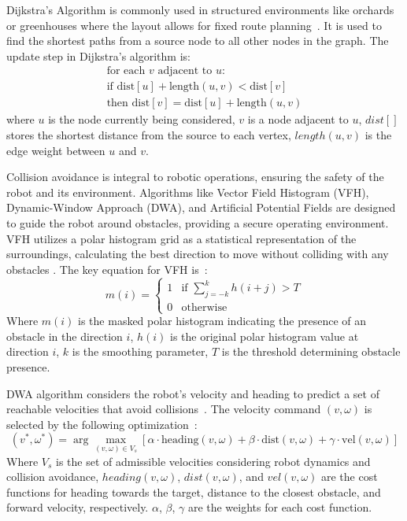 \documentclass[a4paper,fleqn]{cas-dc}
\begin{document}
Dijkstra’s Algorithm is commonly used in structured environments like orchards or greenhouses where the layout allows for fixed route planning~\cite{silwal2017design, dijkstra1959note}. It is used to find the shortest paths from a source node to all other nodes in the graph. The update step in Dijkstra's algorithm is:
\begin{equation}
\begin{aligned}
\text{for each } v \text{ adjacent to } u: \\
\text{if } \text{dist}[u] + \text{length}(u, v) < \text{dist}[v] \\
\text{then } \text{dist}[v] = \text{dist}[u] + \text{length}(u, v)
\end{aligned}
\label{eq:dijkstra}
\end{equation}
where $u$ is the node currently being considered, $v$ is a node adjacent to $u$, $dist[]$ stores the shortest distance from the source to each vertex, $length(u,v)$ is the edge weight between $u$ and $v$.

Collision avoidance is integral to robotic operations, ensuring the safety of the robot and its environment. Algorithms like Vector Field Histogram (VFH), Dynamic-Window Approach (DWA), and Artificial Potential Fields are designed to guide the robot around obstacles, providing a secure operating environment. 
VFH utilizes a polar histogram grid as a statistical representation of the surroundings, calculating the best direction to move without colliding with any obstacles \cite{silwal2017design}. The key equation for VFH is~\cite{borenstein1991vfh}:
\begin{equation}
m(i) = \begin{cases} 
1 & \text{if } \sum_{j=-k}^k h(i+j) > T \\
0 & \text{otherwise} 
\end{cases}
\label{eq:vfh}
\end{equation}
Where $m(i)$ is the masked polar histogram indicating the presence of an obstacle in the direction $i$,
$h(i)$ is the original polar histogram value at direction $i$, $k$ is the smoothing parameter, $T$ is the threshold determining obstacle presence.

DWA algorithm considers the robot's velocity and heading to predict a set of reachable velocities that avoid collisions~\cite{sepulveda2020robotic}.   The velocity command $(v,\omega)$ is selected by the following optimization~\cite{fox1997dynamic}:
\begin{equation}
(v^*, \omega^*) = \arg \max_{(v, \omega) \in V_s} [ \alpha \cdot \text{heading}(v, \omega) + \beta \cdot \text{dist}(v, \omega) + \gamma \cdot \text{vel}(v, \omega) ]
\label{eq:dwa}
\end{equation}
Where $V_s$ is the set of admissible velocities considering robot dynamics and collision avoidance, $heading(v, \omega)$, $dist(v, \omega)$, and $vel(v, \omega)$ are the cost functions for heading towards the target, distance to the closest obstacle, and forward velocity, respectively. $\alpha$, $\beta$, $\gamma$ are the weights for each cost function.
\end{document}
